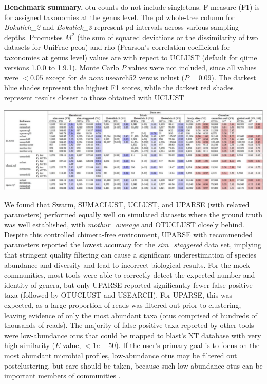 \begin{table}
\caption[Benchmark summary]{\textbf{Benchmark summary.} \gls{otu} counts do not
include singletons. F measure (F1) is for assigned taxonomies at the genus level.
The \gls{pd} whole-tree column for \emph{Bokulich\_2} and \emph{Bokulick\_3}
represent \gls{pd} intervals across various sampling depths. Procrustes $M^2$
(the sum of squared deviations or the dissimilarity of two datasets for UniFrac
\gls{pcoa}) and rho (Pearson's correlation coefficient for taxonomies at genus
level) values are with repect to UCLUST (default for \gls{qiime} versions 1.0.0
to 1.9.1). Monte Carlo $P$ values were not included, since all values were
$<0.05$ except for \emph{de novo} usearch52 versus uclust ($P = 0.09$). The darkest
blue shades represent the highest F1 scores, while the darkest red shades represent
results closest to those obtained with UCLUST}
\label{stateArtT2}
\includegraphics[width=\columnwidth]{chapter_otupicking_figures/stateArtT2.pdf}
\end{table}

We found that Swarm, SUMACLUST, UCLUST, and UPARSE (with relaxed parameters)
performed equally well on simulated datasets where the ground truth was well
established, with \emph{mothur\_average} and OTUCLUST closely behind. Despite
this controlled chimera-free environment, UPARSE with recommended parameters
reported the lowest accuracy for the \emph{sim\_staggered} data set, implying
that stringent quality filtering can cause a significant underestimation of
species abundance and diversity and lead to incorrect biological results. For
the mock communities, most tools were able to correctly detect the expected
number and identity of genera, but only UPARSE reported significantly fewer
false-positive taxa (followed by OTUCLUST and USEARCH). For UPARSE, this was
expected, as a large proportion of reads was filtered out prior to clustering,
leaving evidence of only the most abundant taxa (\gls{otu}s comprised of
hundreds of thousands of reads). The majority of false-positive taxa reported
by other tools were low-abundance \gls{otu}s that could be mapped to \gls{blast}’s NT
database with very high similarity ($E$ value, $<1e−50$). If the user’s primary
goal is to focus on the most abundant microbial profiles, low-abundance \gls{otu}s
may be filtered out postclustering, but care should be taken, because such low-abundance
\gls{otu}s can be important members of communities \cite{Shade2014}.

